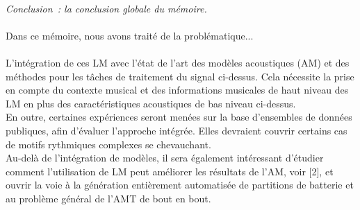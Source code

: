 \textit{\\Conclusion~: la conclusion globale du mémoire.}\\\\
Dans ce mémoire, nous avons traité de la problématique...\\\\

L'intégration de ces LM avec l'état de l'art des modèles acoustiques (AM) et des méthodes pour les tâches de traitement du signal ci-dessus. Cela nécessite la prise en compte du contexte musical et des informations musicales de haut niveau des LM en plus des caractéristiques acoustiques de bas niveau ci-dessus.\\
En outre, certaines expériences seront menées sur la base d'ensembles de données publiques, afin d'évaluer l'approche intégrée. Elles devraient couvrir certains cas de motifs rythmiques complexes se chevauchant.\\

Au-delà de l'intégration de modèles, il sera également intéressant d'étudier comment l'utilisation de LM peut améliorer les résultats de l'AM, voir [2], et ouvrir la voie à la génération entièrement automatisée de partitions de batterie et au problème général de l'AMT de bout en bout.
\cite{8350302}